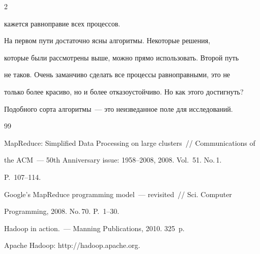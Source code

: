\begin{multicols}{2}
\begin{enumerate}[(1)]
кажется равноправие всех процессов. 


\end{enumerate}





      На первом пути достаточно ясны алгоритмы. Некоторые решения, 


которые были рассмотрены выше, можно прямо использовать. Второй путь 


не таков. Очень заманчиво сделать все процессы равноправными, это не 


только более красиво, но и более отказоустойчиво. Но как этого достигнуть? 


Подобного сорта алгоритмы~--- это неизведанное поле для исследований. 





{\small\frenchspacing


{%




\begin{thebibliography}{99}









MapReduce: Simplified Data Processing on large clusters~// Communications of 


the ACM~--- 50th Anniversary issue: 1958--2008, 2008. Vol.~51. No.\,1. 


P.~107--114.









Google's MapReduce programming model~--- revisited~// Sci. Computer 


Programming, 2008. No.\,70. P.~1--30.









Hadoop in action.~--- Manning Publications, 2010. 325~p.







Apache Hadoop: {\sf http://hadoop.apache.org}.






\end{thebibliography}}}
\end{multicols}
